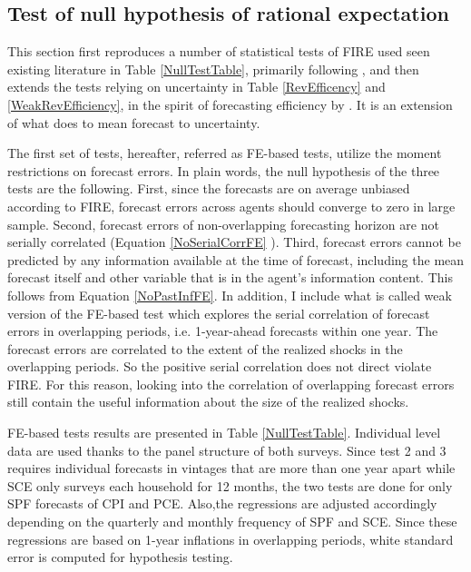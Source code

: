 \documentclass[]{article}
\begin{document}
	
	\subsection{Test of null hypothesis of rational expectation}\label{NullTest}
	
	This section first reproduces a number of statistical tests of FIRE used seen existing literature in Table \ref{NullTestTable}, primarily following \citet{mankiw2003disagreement},  and then extends the tests relying on uncertainty in Table \ref{RevEfficency} and \ref{WeakRevEfficiency}, in the spirit of forecasting efficiency by \citet{nordhaus1987forecasting}. It is an extension of what \citet{fuhrer2018intrinsic} does to mean forecast to uncertainty.  
	
	The first set of tests, hereafter, referred as FE-based tests, utilize the moment restrictions on forecast errors. In plain words, the null hypothesis of the three tests are the following. First, since the forecasts are on average unbiased according to FIRE, forecast errors across agents should converge to zero in large sample. Second, forecast errors of non-overlapping forecasting horizon are not serially correlated (Equation \ref{NoSerialCorrFE} ).  Third, forecast errors cannot be predicted by any information available at the time of forecast, including the mean forecast itself and other variable that is in the agent's information content. This follows from Equation \ref{NoPastInfFE}. In addition, I include what is called weak version of the FE-based test which explores the serial correlation of forecast errors in overlapping periods,  i.e. 1-year-ahead forecasts within one year. The forecast errors are correlated to the extent of the realized shocks in the overlapping periods. So the positive serial correlation does not direct violate FIRE. For this reason, looking into the correlation of overlapping forecast errors still contain the useful information about the size of the realized shocks. 
	
	FE-based tests results are presented in Table \ref{NullTestTable}. Individual level data are used thanks to the panel structure of both surveys. Since test 2 and 3 requires individual forecasts in vintages that are more than one year apart while SCE only surveys each household for 12 months, the two tests are done for only SPF forecasts of CPI and PCE. Also,the regressions are adjusted accordingly depending on the quarterly and monthly frequency of SPF and SCE. Since these regressions are based on 1-year inflations in overlapping periods, white standard error is computed for hypothesis testing. 
	
\end{document}
